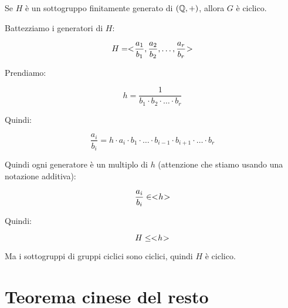 \begin{esercizio}
	Se $H$ è un sottogruppo finitamente generato di $(\mathbb{Q}, +)$, allora $G$ è ciclico.
\end{esercizio}
\begin{soluzione}
	Battezziamo i generatori di $H$:
	
	\begin{equation}
		H = < \negmedspace \dfrac{a_1}{b_1}, \dfrac{a_2}{b_2}, \dots, \dfrac{a_r}{b_r} \negmedspace >
	\end{equation}

	Prendiamo:
	
	\begin{equation}
		h = \dfrac{1}{b_1 \cdot b_2 \cdot \dots \cdot b_r}
	\end{equation}

	Quindi:
	
	\begin{equation}
		\dfrac{a_i}{b_i} = h \cdot a_i \cdot b_1 \cdot \dots \cdot b_{i-1} \cdot b_{i+1} \cdot \dots \cdot b_r
	\end{equation}

	Quindi ogni generatore è un multiplo di $h$ (attenzione che stiamo usando una notazione additiva):
	
	\begin{equation}
		\dfrac{a_i}{b_i} \in < \negmedspace h \negmedspace >
	\end{equation}

	Quindi:
	
	\begin{equation}
		H \le < \negmedspace h \negmedspace >
	\end{equation}

	Ma i sottogruppi di gruppi ciclici sono ciclici, quindi $H$ è ciclico.
\end{soluzione}

\section{Teorema cinese del resto}

